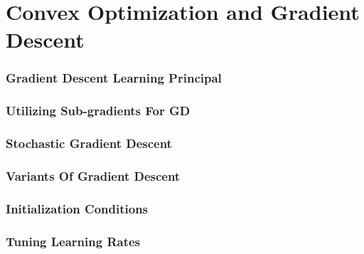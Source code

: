 \chapter{Convex Optimization and Gradient Descent}
\label{chap:conv_opt}
    \subsection{Gradient Descent Learning Principal}
    \subsection{Utilizing Sub-gradients For GD}
    \subsection{Stochastic Gradient Descent}
    \subsection{Variants Of Gradient Descent}
        \subsection{Initialization Conditions}
        \subsection{Tuning Learning Rates}